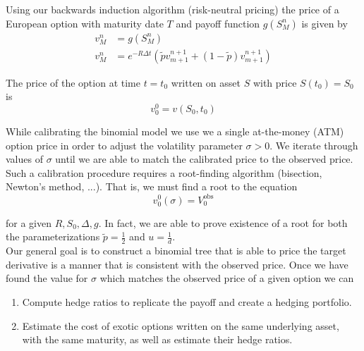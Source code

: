 \documentclass[12pt]{article}
\newlength\tindent
\renewcommand{\indent}{\hspace*{\tindent}}
\begin{document}
Using our backwards induction algorithm (risk-neutral pricing) the price of a European option with maturity date $T$ and payoff function $g(S^n_M)$ is given by
\begin{align*}
	v^n_M &= g(S^n_M) \\
	v^n_M &= e^{-R\Delta t} \left( \tilde{p}v^{n + 1}_{m + 1} + (1 - \tilde{p})v^{n + 1}_{m + 1} \right)
\end{align*}

The price of the option at time $t = t_0$ written on asset $S$ with price $S(t_0) = S_0$ is
\begin{equation*}
	v^0_0 = v(S_0,t_0)
\end{equation*}	

\indent While calibrating the binomial model we use we a single at-the-money (ATM) option price in order to adjust the volatility parameter $\sigma > 0$. We iterate through values of $\sigma$ until we are able to match the calibrated price to the observed price. \\

\indent Such a calibration procedure requires a root-finding algorithm (bisection, Newton's method, ...). That is, we must find a root to the equation
\begin{equation*}
	v^0_0(\sigma) = V^{\text{obs}}_0
\end{equation*}

for a given $R, S_0, \Delta, g$. In fact, we are able to prove existence of a root for both the parameterizations $\tilde{p} = \frac{1}{2}$ and $u = \frac{1}{d}$. \\

\indent Our general goal is to construct a binomial tree that is able to price the target derivative is a manner that is consistent with the observed price. Once we have found the value for $\sigma$ which matches the observed price of a given option we can 
\begin{enumerate}[1)]
	\item Compute hedge ratios to replicate the payoff and create a hedging portfolio.
	\item Estimate the cost of exotic options written on the same underlying asset, with the same maturity, as well as estimate their hedge ratios.
\end{enumerate} 
\end{document}
